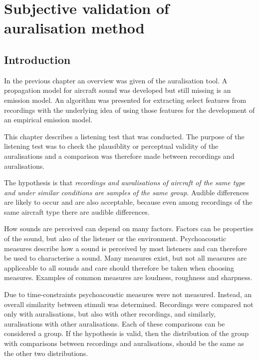 \chapter{Subjective validation of auralisation method}\label{chapter:test}

\section{Introduction}
In the previous chapter an overview was given of the auralisation tool. A
propagation model for aircraft sound was developed but still missing is an
emission model. An algorithm was presented for extracting select features from
recordings with the underlying idea of using those features for the development
of an empirical emission model.

This chapter describes a listening test that was conducted. The purpose of the
listening test was to check the plausiblity or perceptual validity of the
auralisations and a comparison was therefore made between recordings and
auralisations.

The hypothesis is that \emph{recordings and auralisations of aircraft of the same
type and under similar conditions are samples of the same group}.
Audible differences are likely to occur and are also acceptable, because even
among recordings of the same aircraft type there are audible differences.

How sounds are perceived can depend on many factors. Factors can be properties
of the sound, but also of the listener or the environment. Psychoacoustic
measures describe how a sound is perceived by most listeners and can therefore
be used to characterise a sound. Many measures exist, but not all measures are
appliceable to all sounds and care should therefore be taken when choosing
measures. Examples of common measures are loudness, roughness and sharpness.

Due to time-constraints psychoacoustic measures were not measured. Instead, an
overall similarity between stimuli was determined. Recordings were compared not
only with auralisations, but also with other recordings, and similarly,
auralisations with other auralisations. Each of these comparisons can be
considered a group. If the hypothesis is valid, then the distribution of the
group with comparisons between recordings and auralisations, should be the same
as the other two distributions.

%

